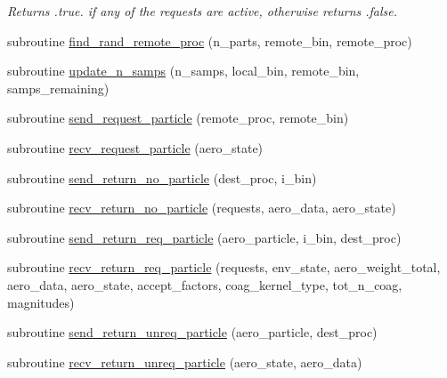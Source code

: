 \begin{DoxyCompactItemize}
\begin{DoxyCompactList}\small\item\em Returns {\ttfamily }.true. if any of the requests are active, otherwise returns {\ttfamily }.false. \end{DoxyCompactList}\item 
subroutine \mbox{\hyperlink{namespacepmc__coagulation__dist_a651e57c3eb431e54cc014e0121d700aa}{find\+\_\+rand\+\_\+remote\+\_\+proc}} (n\+\_\+parts, remote\+\_\+bin, remote\+\_\+proc)
\item 
subroutine \mbox{\hyperlink{namespacepmc__coagulation__dist_a16eacae36a5a5a01dc3bbfdd96f7bdb3}{update\+\_\+n\+\_\+samps}} (n\+\_\+samps, local\+\_\+bin, remote\+\_\+bin, samps\+\_\+remaining)
\item 
subroutine \mbox{\hyperlink{namespacepmc__coagulation__dist_a99ffd44c548887bda417e61c67ea0bbc}{send\+\_\+request\+\_\+particle}} (remote\+\_\+proc, remote\+\_\+bin)
\item 
subroutine \mbox{\hyperlink{namespacepmc__coagulation__dist_addc40be25e3ef491aa13a10e628afbf9}{recv\+\_\+request\+\_\+particle}} (aero\+\_\+state)
\item 
subroutine \mbox{\hyperlink{namespacepmc__coagulation__dist_a6fd21d148a797e93278b9ca7347b2040}{send\+\_\+return\+\_\+no\+\_\+particle}} (dest\+\_\+proc, i\+\_\+bin)
\item 
subroutine \mbox{\hyperlink{namespacepmc__coagulation__dist_a189b1c8e85725b70f1b80f44cdf8a2e1}{recv\+\_\+return\+\_\+no\+\_\+particle}} (requests, aero\+\_\+data, aero\+\_\+state)
\item 
subroutine \mbox{\hyperlink{namespacepmc__coagulation__dist_af9f9db875f5df9d3e69ce63accf95d98}{send\+\_\+return\+\_\+req\+\_\+particle}} (aero\+\_\+particle, i\+\_\+bin, dest\+\_\+proc)
\item 
subroutine \mbox{\hyperlink{namespacepmc__coagulation__dist_a0e6ac760034791004d9e50f77c786ed4}{recv\+\_\+return\+\_\+req\+\_\+particle}} (requests, env\+\_\+state, aero\+\_\+weight\+\_\+total, aero\+\_\+data, aero\+\_\+state, accept\+\_\+factors, coag\+\_\+kernel\+\_\+type, tot\+\_\+n\+\_\+coag, magnitudes)
\item 
subroutine \mbox{\hyperlink{namespacepmc__coagulation__dist_a2d80a8bdea3206f51071cbd58ac39e50}{send\+\_\+return\+\_\+unreq\+\_\+particle}} (aero\+\_\+particle, dest\+\_\+proc)
\item 
subroutine \mbox{\hyperlink{namespacepmc__coagulation__dist_a14c2a349dca62ade3455519ee9495562}{recv\+\_\+return\+\_\+unreq\+\_\+particle}} (aero\+\_\+state, aero\+\_\+data)

\end{DoxyCompactItemize}
